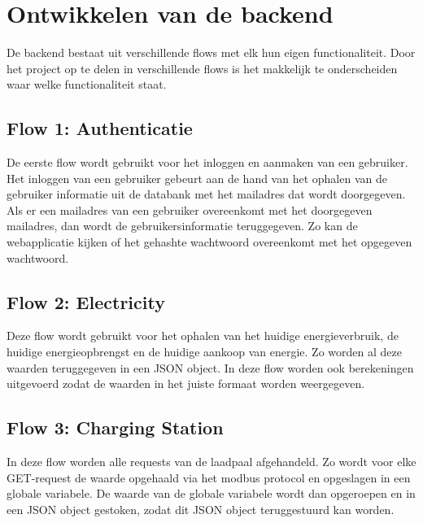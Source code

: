 \section{Ontwikkelen van de backend}
\label{sec:proefopstelling-backend}

De backend bestaat uit verschillende flows met elk hun eigen functionaliteit. Door het project op te delen in verschillende flows is het makkelijk te onderscheiden waar welke functionaliteit staat.

\subsection{Flow 1: Authenticatie}
\label{subsec:proefopstelling-authenticatie}

De eerste flow wordt gebruikt voor het inloggen en aanmaken van een gebruiker. Het inloggen van een gebruiker gebeurt aan de hand van het ophalen van de gebruiker informatie uit de databank met het mailadres dat wordt doorgegeven. Als er een mailadres van een gebruiker overeenkomt met het doorgegeven mailadres, dan wordt de gebruikersinformatie teruggegeven. Zo kan de webapplicatie kijken of het gehashte wachtwoord overeenkomt met het opgegeven wachtwoord.

\subsection{Flow 2: Electricity}
\label{subsec:proefopstelling-electricity}

Deze flow wordt gebruikt voor het ophalen van het huidige energieverbruik, de huidige energieopbrengst en de huidige aankoop van energie. Zo worden al deze waarden teruggegeven in een JSON object. In deze flow worden ook berekeningen uitgevoerd zodat de waarden in het juiste formaat worden weergegeven.

\subsection{Flow 3: Charging Station}
\label{subsec:proefopstelling-charging-station}

In deze flow worden alle requests van de laadpaal afgehandeld. Zo wordt voor elke GET-request de waarde opgehaald via het modbus protocol en opgeslagen in een globale variabele. De waarde van de globale variabele wordt dan opgeroepen en in een JSON object gestoken, zodat dit JSON object teruggestuurd kan worden.\\

